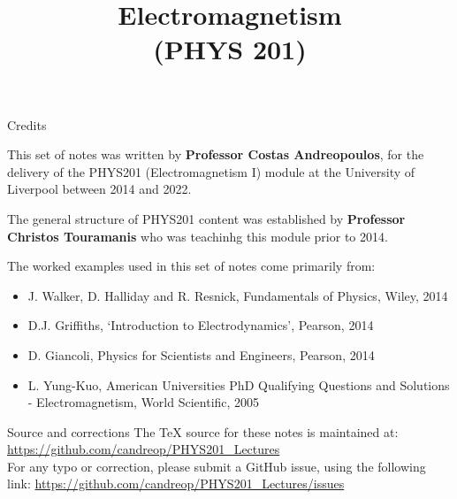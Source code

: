 \renewcommand{\prevlecture}{0}
\renewcommand{\thislecture}{0}
\renewcommand{\nextlecture}{1}

%
%

\title[PHYS 201]
{
  \Huge{Electromagnetism}\\(PHYS 201)\\
}



\begin{frame}[plain]
  \titlepage
\end{frame}


%
%

\begin{frame}{Credits}

{\scriptsize
  This set of notes was written by
  {\bf Professor Costas Andreopoulos},
  for the delivery of the
  PHYS201 (Electromagnetism I) module
  at the University of Liverpool between 2014 and 2022.\\

  \vspace{0.2cm}

  The general structure of PHYS201 content
  was established by {\bf Professor Christos Touramanis}
  who was teachinhg this module prior to 2014.

  \vspace{0.2cm}

  The worked examples used in this set of notes come primarily from:
  \begin{itemize}
    \item J. Walker, D. Halliday and R. Resnick, Fundamentals of Physics, Wiley, 2014
    \item D.J. Griffiths, `Introduction to Electrodynamics', Pearson, 2014
    \item D. Giancoli, Physics for Scientists and Engineers, Pearson, 2014
    \item L. Yung-Kuo, American Universities PhD Qualifying Questions and Solutions - Electromagnetism, World Scientific, 2005\\
  \end{itemize}

  \vspace{0.3cm}

  \begin{block001}{Source and corrections}
  The TeX source for these notes is maintained at:\\
  {\color{blue} \url{https://github.com/candreop/PHYS201_Lectures}}\\
  \vspace{0.2cm}
  For any typo or correction, please submit a GitHub issue, using
  the following link: {\color{blue} \url{https://github.com/candreop/PHYS201_Lectures/issues}}
  \end{block001}
}
\end{frame}


